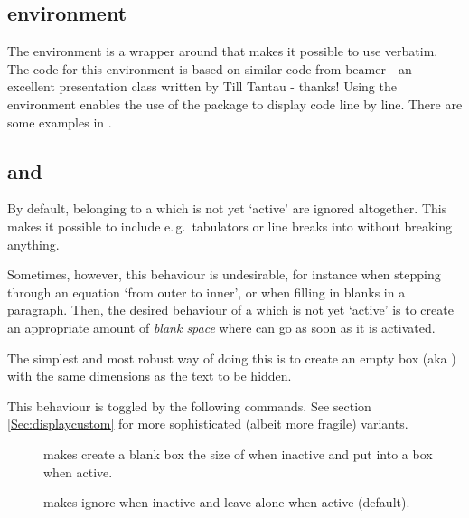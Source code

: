 \documentclass[12pt]{scrartcl}
\let\newslide=\relax
\begin{document}
  \newslide

  \subsection{ environment}\label{Sec:fragilesteps}%

  The  environment is a wrapper around 
  that makes it possible to use verbatim. The code for this environment is based on similar code from beamer - an
  excellent presentation class written by Till Tantau - thanks! Using the  environment
  enables the use of the  package to display code line by line. There are some examples in
  .

  \newslide

  \subsection{ and }\label{Sec:boxedsteps}%
  By default,  belonging to a  which is not yet `active' are ignored altogether. This
  makes it possible to include e.\,g.\ tabulators \code{\&} or line breaks into  without breaking
  anything.

  Sometimes, however, this behaviour is undesirable, for instance when stepping through an equation `from outer to
  inner', or when filling in blanks in a paragraph. Then, the desired behaviour of a  which is not yet
  `active' is to create an appropriate amount of \emph{blank space} where  can go as soon as it is
  activated.

  \newslide

  The simplest and most robust way of doing this is to create an empty box (aka ) with the same
  dimensions as the text to be hidden.

  This behaviour is toggled by the following commands. See section \ref{Sec:displaycustom} for more sophisticated
  (albeit more fragile) variants.
  \begin{description}
  \item[] makes  create a blank box the size of  when
    inactive and put  into a box when active.
  \item[] makes  ignore  when inactive and leave
     alone when active (default).
  \end{description}
\end{document}
